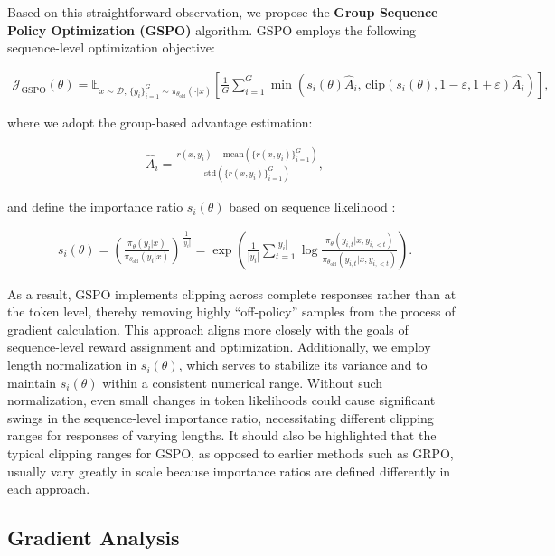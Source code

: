 Based on this straightforward observation, we propose the \textbf{Group Sequence Policy Optimization (GSPO)} algorithm. GSPO employs the following sequence-level optimization objective:

\begin{align}
\mathcal{J}_\text{GSPO} (\theta) =
\mathbb{E}_{ x \sim \mathcal{D},\, \{y_i\}_{i=1}^G \sim \pi_{\theta_\text{old}}( \cdot | x) }
\left[ 
\frac{1}{G} \sum_{i=1}^{G}
\min \left( s_{i}(\theta)  \widehat{A}_{i},  \, \mathrm{clip} \left( s_{i}(\theta), 1 - {\varepsilon}, 1 + {\varepsilon} \right) \widehat{A}_{i} \right) 
\right],
\label{equ:gspo}
\end{align}

where we adopt the group-based advantage estimation:

\begin{align}
\widehat{A}_{i} = \frac{r(x, y_i) - \mathrm{mean} \left( \{ r(x, y_i) \}_{i=1}^G \right) }{ \mathrm{std} \left( \{ r(x, y_i) \}_{i=1}^G \right) },
\end{align}

and define the importance ratio $s_{i}(\theta)$ based on sequence likelihood \citep{click}:

\begin{align}
s_{i}(\theta) = \left( \frac{ \pi_{\theta} (y_i | x) }{ \pi_{\theta_\text{old}} (y_i | x)} \right)^{\frac{1}{|y_i|}}
=
\exp \left( \frac{1}{|y_i|} \sum_{t=1}^{|y_i|} \log \frac{ \pi_{\theta} (y_{i,t} | x, y_{i,<t}) }{ \pi_{\theta_\text{old}} (y_{i,t} | x,y_{i,<t})} \right).
\end{align}

As a result, GSPO implements clipping across complete responses rather than at the token level, thereby removing highly ``off-policy'' samples from the process of gradient calculation. This approach aligns more closely with the goals of sequence-level reward assignment and optimization. Additionally, we employ length normalization in $s_{i}(\theta)$, which serves to stabilize its variance and to maintain $s_{i}(\theta)$ within a consistent numerical range. Without such normalization, even small changes in token likelihoods could cause significant swings in the sequence-level importance ratio, necessitating different clipping ranges for responses of varying lengths. It should also be highlighted that the typical clipping ranges for GSPO, as opposed to earlier methods such as GRPO, usually vary greatly in scale because importance ratios are defined differently in each approach.

\subsection{Gradient Analysis}
\label{subsec:gradient}

